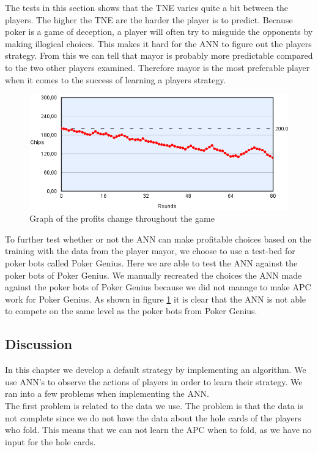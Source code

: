 The tests in this section shows that the TNE varies quite a bit between the players. The higher the TNE are the harder the player is to predict. Because poker is a game of deception, a player will often try to misguide the opponents by making illogical choices. This makes it hard for the ANN to figure out the players strategy.
From this we can tell that mayor is probably more predictable compared to the two other players examined. Therefore mayor is the most preferable player when it comes to the success of learning a players strategy.


\begin{figure}[H]
  \center
    \includegraphics[scale=0.6]{images/nn/finaltest.png}
  \caption{Graph of the profits change throughout the game\label{fig:finaltest}}
\end{figure}

To further test whether or not the ANN can make profitable choices based on the training with the data from the player mayor, we choose to use a test-bed for poker bots called Poker Genius. Here we are able to test the ANN against the poker bots of Poker Genius. We manually recreated the choices the ANN made against the poker bots of Poker Genius because we did not manage to make APC work for Poker Genius. As shown in figure \ref{fig:finaltest} it is clear that the ANN is not able to compete on the same level as the poker bots from Poker Genius.


\subsection{Discussion}
In this chapter we develop a default strategy by implementing an algorithm. We use ANN's to observe the actions of players in order to learn their strategy. We ran into a few problems when implementing the ANN.\\

The first problem is related to the data we use. The problem is that  the data is not complete since we do not have the data about the hole cards of the players who fold. This means that we can not learn the APC when to fold, as we have no input for the hole cards. 

